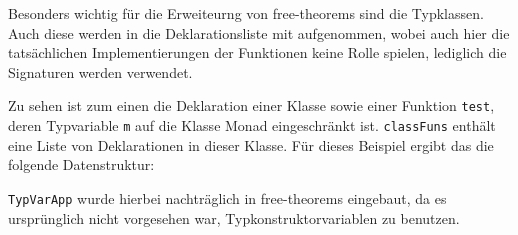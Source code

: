 \documentclass[11pt]{article} %
\begin{document}
Besonders wichtig für die Erweiteurng von free-theorems sind die Typklassen. Auch diese werden in die Deklarationsliste mit aufgenommen, wobei auch hier die tatsächlichen Implementierungen der Funktionen keine Rolle spielen, lediglich die Signaturen werden verwendet.



Zu sehen ist zum einen die Deklaration einer Klasse sowie einer Funktion \texttt{test}, deren Typvariable \texttt{m} auf die Klasse Monad eingeschränkt ist. \texttt{classFuns} enthält eine Liste von Deklarationen in dieser Klasse. Für dieses Beispiel ergibt das die folgende Datenstruktur:



\texttt{TypVarApp} wurde hierbei nachträglich in free-theorems eingebaut, da es ursprünglich nicht vorgesehen war, Typkonstruktorvariablen zu benutzen.
\end{document}
